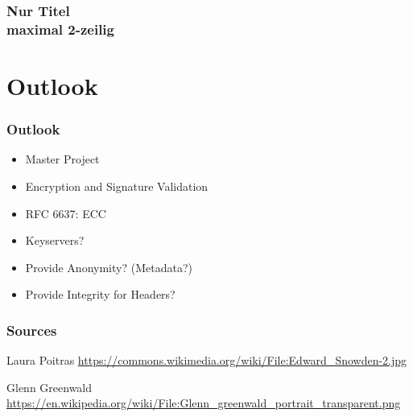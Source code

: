 \documentclass{beamer}
\begin{document}
\begin{frame}
	\frametitle{Nur Titel \\maximal 2-zeilig}
\end{frame}



\section{Outlook}

\begin{frame}
	\frametitle{Outlook}
	\begin{itemize}
		\item Master Project
		\item Encryption and Signature Validation
		\item RFC 6637: ECC
		\item Keyservers?
	\end{itemize}
	\begin{itemize}
		\item Provide Anonymity? (Metadata?)%
		 \item Provide Integrity for Headers?
	\end{itemize}
\end{frame}

\begin{frame}
\frametitle{Sources}
\small
\begin{thebibliography}{1}
	 Laura Poitras \small \url{https://commons.wikimedia.org/wiki/File:Edward_Snowden-2.jpg} 
	
	 Glenn Greenwald \small \url{https://en.wikipedia.org/wiki/File:Glenn_greenwald_portrait_transparent.png}

\end{thebibliography}
\end{frame}


\end{document}
